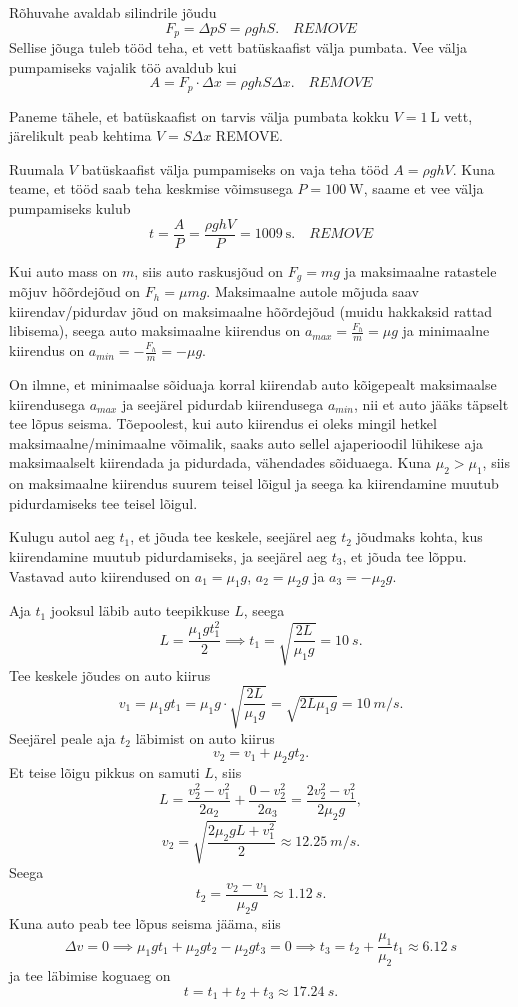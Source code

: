 \documentclass[10pt]{article}
\newcommand{\pp}[1]{REMOVE}
\begin{document}
Rõhuvahe avaldab silindrile jõudu
$$F_p=\Delta p S = \rho gh S. \quad \pp{2}$$
Sellise jõuga tuleb tööd teha, et vett batüskaafist välja pumbata. Vee välja pumpamiseks vajalik töö avaldub kui
$$A=F_p\cdot \Delta x= \rho gh S \Delta x. \quad \pp{2}$$

Paneme tähele, et batüskaafist on tarvis välja pumbata kokku $V=\SI{1}{\liter}$ vett, järelikult peab kehtima $V=S\Delta x$ \pp{1}.

Ruumala $V$ batüskaafist välja pumpamiseks on vaja teha tööd $A=\rho g h V$. Kuna teame, et tööd saab teha keskmise võimsusega $P=\SI{100}{\W}$, saame et vee välja pumpamiseks kulub
$$t=\frac{A}{P}=\frac{\rho g h V}{P}=\SI{1009}{\s}. \quad \pp{1}$$
\probend
\bigskip


\solu
Kui auto mass on $m$, siis auto raskusjõud on $F_g = mg$ ja maksimaalne ratastele mõjuv hõõrdejõud on $F_h = \mu mg$. Maksimaalne autole mõjuda saav kiirendav/pidurdav jõud on maksimaalne hõõrdejõud (muidu hakkaksid rattad libisema), seega auto maksimaalne kiirendus on $a_{max} = \frac{F_h}{m} = \mu g$ ja minimaalne kiirendus on $a_{min}=-\frac{F_h}{m}= -\mu g$.

On ilmne, et minimaalse sõiduaja korral kiirendab auto kõigepealt maksimaalse kiirendusega $a_{max}$ ja seejärel pidurdab kiirendusega $a_{min}$, nii et auto jääks täpselt tee lõpus seisma. Tõepoolest, kui auto kiirendus ei oleks mingil hetkel maksimaalne/minimaalne võimalik, saaks auto sellel ajaperioodil lühikese aja maksimaalselt kiirendada ja pidurdada, vähendades sõiduaega. Kuna $\mu_2 > \mu_1$, siis on maksimaalne kiirendus suurem teisel lõigul ja seega ka kiirendamine muutub pidurdamiseks tee teisel lõigul.

Kulugu autol aeg $t_1$, et jõuda tee keskele, seejärel aeg $t_2$ jõudmaks kohta, kus kiirendamine muutub pidurdamiseks, ja seejärel aeg $t_3$, et jõuda tee lõppu. Vastavad auto kiirendused on $a_1=\mu_1 g$, $a_2=\mu_2 g$ ja $a_3=-\mu_2 g$.

Aja $t_1$ jooksul läbib auto teepikkuse $L$, seega
\[
  L=\frac{\mu_1 g t_1^2}{2} \implies t_1 = \sqrt{\frac{2L}{\mu_1 g}} = \SI{10}{s}.
\]
Tee keskele jõudes on auto kiirus
\[
  v_1 = \mu_1 g t_1 = \mu_1 g \cdot \sqrt{\frac{2L}{\mu_1 g}} = \sqrt{2L\mu_1 g} = \SI{10}{m/s}.
\]
Seejärel peale aja $t_2$ läbimist on auto kiirus
\[
  v_2 = v_1 + \mu_2 g t_2.
\]
Et teise lõigu pikkus on samuti $L$, siis
\[
  L = \frac{v_2^2 - v_1^2}{2a_2} + \frac{0-v_2^2}{2a_3} = \frac{2v_2^2 - v_1^2}{2\mu_2 g},
\]
\[
  v_2 = \sqrt{\frac{2\mu_2 gL+v_1^2}{2}} \approx \SI{12.25}{m/s}.
\]
Seega
\[
  t_2 = \frac{v_2-v_1}{\mu_2 g} \approx \SI{1.12}{s}.
\]
Kuna auto peab tee lõpus seisma jääma, siis
\[
  \Delta v = 0 \implies \mu_1 g t_1 + \mu_2 g t_2 - \mu_2 g t_3 = 0 \implies t_3 = t_2 + \frac{\mu_1}{\mu_2}t_1 \approx \SI{6.12}{s}
\]
ja tee läbimise koguaeg on
\[
  t=t_1+t_2+t_3 \approx \SI{17,24}{s}.
\]
\probend
\bigskip
\end{document}
